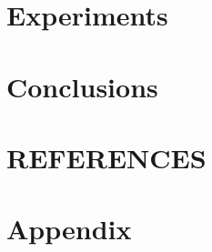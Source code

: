 \documentclass[sigconf, nonacm]{acmart}
\begin{document}
\section{Experiments}
\label{sec:experiments}


\section{Conclusions}
\label{sec:conclusions}


\section{REFERENCES}
\label{sec:references}




\newpage
\appendix
\section{Appendix}

\end{document}
